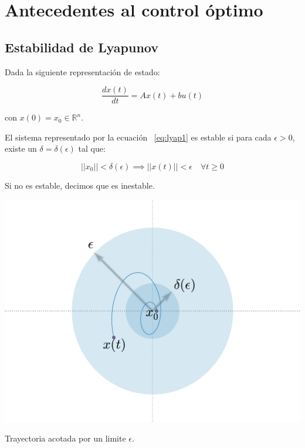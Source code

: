 
\chapter{Antecedentes al control óptimo}


    \section{Estabilidad de Lyapunov}

        Dada la siguiente representación de estado:

        \begin{equation} \label{eq:lyap1}
            \frac{dx(t)}{dt} = A x(t) + b u(t)
        \end{equation}

        con $x(0) = x_0  \in \mathbb{R}^n$.

        \begin{definicion}
            El sistema representado por la ecuación ~\ref{eq:lyap1} es estable si para cada $\epsilon > 0$, existe un $\delta = \delta(\epsilon)$ tal que:

            \begin{equation*}
                ||x_0|| < \delta(\epsilon) \implies  ||x(t)||  < \epsilon \quad \forall t \ge 0
            \end{equation*}

            Si no es estable, decimos que es inestable.
        \end{definicion}

        \begin{marginfigure}
            \centering
            \includegraphics[width=\textwidth]{./imagenes/trayectoriaacotada.pdf}
            \caption{\label{fig:trayectoriaestable}Trayectoria acotada por un limite $\epsilon$.}
        \end{marginfigure}

